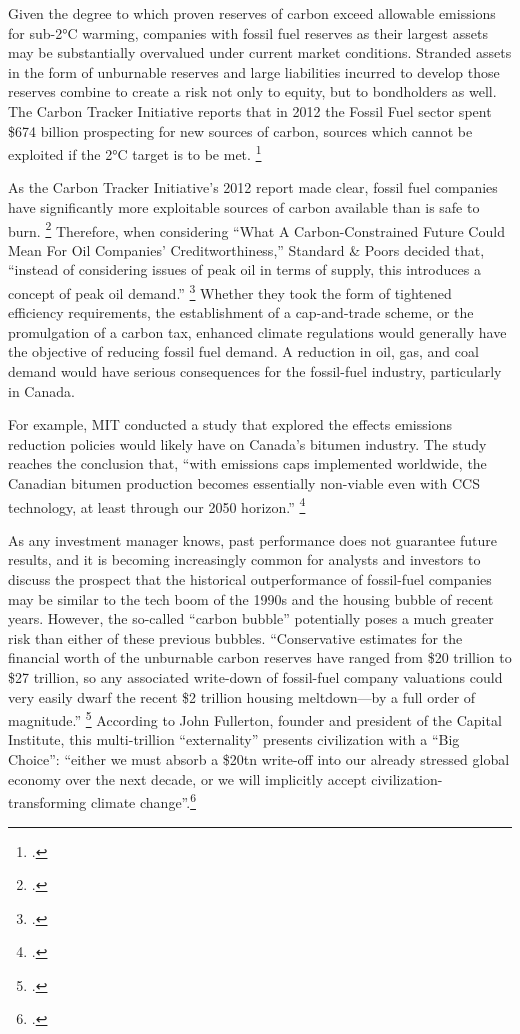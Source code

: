 Given the degree to which proven reserves of carbon exceed allowable emissions for sub-2°C warming, companies with fossil fuel reserves as their largest assets may be substantially overvalued under current market conditions. 
Stranded assets in the form of unburnable reserves and large liabilities incurred to develop those reserves combine to create a risk not only to equity, but to bondholders as well.
The Carbon Tracker Initiative reports that in 2012 the Fossil Fuel sector spent \$674 billion prospecting for new sources of carbon, sources which cannot be exploited if the 2°C target is to be met. \footcite{CTI2013}


As the Carbon Tracker Initiative's 2012 report made clear, fossil fuel companies have significantly more exploitable sources of carbon available than is safe to burn. \footcite{CTI2012}
Therefore, when considering ``What A Carbon-Constrained Future Could Mean For Oil Companies' Creditworthiness,'' Standard \& Poors decided that, ``instead of considering issues of peak oil in terms of supply, this introduces a concept of peak oil demand.'' \footcite{SandPConstrained}
Whether they took the form of tightened efficiency requirements, the establishment of a cap-and-trade scheme, or the promulgation of a carbon tax, enhanced climate regulations would generally have the objective of reducing fossil fuel demand.
A reduction in oil, gas, and coal demand would have serious consequences for the fossil-fuel industry, particularly in Canada.



For example, MIT conducted a study that explored the effects  emissions reduction policies would likely have on Canada's bitumen industry.
The study reaches the conclusion that, ``with  emissions caps implemented worldwide, the Canadian bitumen production becomes essentially non-viable even with CCS technology, at least through our 2050 horizon.'' \footcite{MITConstraints}



As any investment manager knows, past performance does not guarantee future results, and it is becoming increasingly common for analysts and investors to discuss the prospect that the historical outperformance of fossil-fuel companies may be similar to the tech boom of the 1990s and the housing bubble of recent years.
However, the so-called ``carbon bubble'' potentially poses a much greater risk than either of these previous bubbles.
``Conservative estimates for the financial worth of the unburnable carbon reserves have ranged from \$20 trillion to \$27 trillion, so any associated write-down of fossil-fuel company valuations could very easily dwarf the recent \$2 trillion housing meltdown—by a full order of magnitude.'' \footcite[][p. 3]{FossilFreeInvesting}
According to John Fullerton, founder and president of the Capital Institute, this multi-trillion ``externality'' presents civilization with a ``Big Choice'': ``either we must absorb a \$20tn write-off into our already stressed global economy over the next decade, or we will implicitly accept civilization-transforming climate change''.\footcite{BigChoice}



